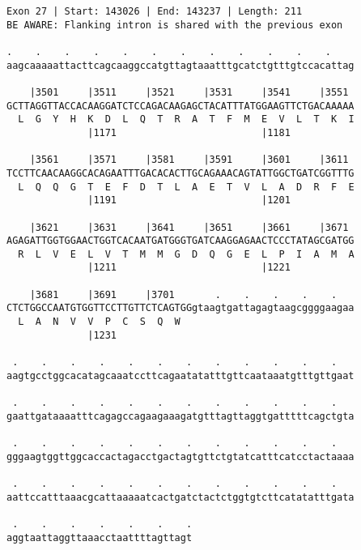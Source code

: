 \documentclass{article}
\begin{document}
\begin{Verbatim}
Exon 27 | Start: 143026 | End: 143237 | Length: 211
BE AWARE: Flanking intron is shared with the previous exon
 
.    .    .    .    .    .    .    .    .    .    .    .    
aagcaaaaattacttcagcaaggccatgttagtaaatttgcatctgtttgtccacattag
  
    |3501     |3511     |3521     |3531     |3541     |3551 
GCTTAGGTTACCACAAGGATCTCCAGACAAGAGCTACATTTATGGAAGTTCTGACAAAAA
  L  G  Y  H  K  D  L  Q  T  R  A  T  F  M  E  V  L  T  K  I
              |1171                         |1181           
  
    |3561     |3571     |3581     |3591     |3601     |3611 
TCCTTCAACAAGGCACAGAATTTGACACACTTGCAGAAACAGTATTGGCTGATCGGTTTG
  L  Q  Q  G  T  E  F  D  T  L  A  E  T  V  L  A  D  R  F  E
              |1191                         |1201           
  
    |3621     |3631     |3641     |3651     |3661     |3671 
AGAGATTGGTGGAACTGGTCACAATGATGGGTGATCAAGGAGAACTCCCTATAGCGATGG
  R  L  V  E  L  V  T  M  M  G  D  Q  G  E  L  P  I  A  M  A
              |1211                         |1221           
  
    |3681     |3691     |3701       .    .    .    .    .   
CTCTGGCCAATGTGGTTCCTTGTTCTCAGTGGgtaagtgattagagtaagcggggaagaa
  L  A  N  V  V  P  C  S  Q  W                              
              |1231                                         
  
 .    .    .    .    .    .    .    .    .    .    .    .   
aagtgcctggcacatagcaaatccttcagaatatatttgttcaataaatgtttgttgaat
  
 .    .    .    .    .    .    .    .    .    .    .    .   
gaattgataaaatttcagagccagaagaaagatgtttagttaggtgatttttcagctgta
  
 .    .    .    .    .    .    .    .    .    .    .    .   
gggaagtggttggcaccactagacctgactagtgttctgtatcatttcatcctactaaaa
  
 .    .    .    .    .    .    .    .    .    .    .    .   
aattccatttaaacgcattaaaaatcactgatctactctggtgtcttcatatatttgata
  
 .    .    .    .    .    .    .
aggtaattaggttaaacctaattttagttagt
\end{Verbatim}
\newpage
\end{document}
